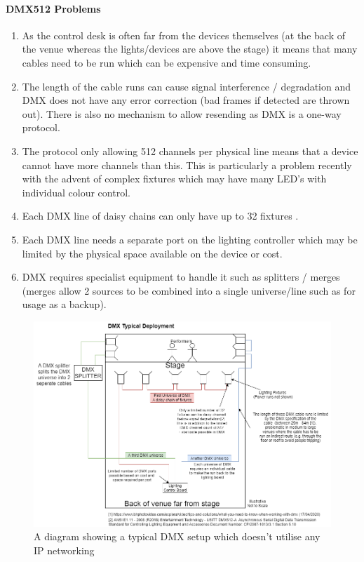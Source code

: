 \documentclass[11pt,a4paper]{article}
\begin{document}
\paragraph*{DMX512 Problems}
\begin{enumerate}{}
	\item As the control desk is often far from the devices themselves (at the back of the venue whereas the lights/devices are above the stage) it means that many cables need to be run which can be expensive and time consuming.
	\item The length of the cable runs can cause signal interference / degradation and DMX does not have any error correction (bad frames if detected are thrown out). There is also no mechanism to allow resending as DMX is a one-way protocol.
	\item The protocol only allowing 512 channels per physical line means that a device cannot have more channels than this. This is particularly a problem recently with the advent of complex fixtures which may have many LED's with individual colour control.
	\item Each DMX line of daisy chains can only have up to 32 fixtures \cite{ANSI_E1.11}.
	\item Each DMX line needs a separate port on the lighting controller which may be limited by the physical space available on the device or cost.
	\item DMX requires specialist equipment to handle it such as splitters / merges (merges allow 2 sources to be combined into a single universe/line such as for usage as a backup).
\end{enumerate}

\begin{figure}[H]
	\includegraphics[width=\textwidth]{TypicalDmxSetup.png}
	\caption{A diagram showing a typical DMX setup which doesn't utilise any IP networking}
	\label{DMX_TYPICAL_SETUP}
\end{figure}
\end{document}
